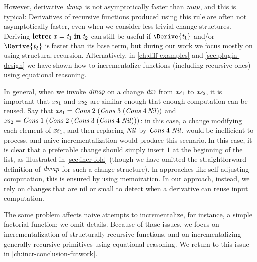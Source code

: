 However, derivative \ensuremath{\Varid{dmap}} is not asymptotically faster than \ensuremath{\Varid{map}}, and this is typical:
Derivatives of recursive functions
produced using this rule are often not asymptotically faster,
even when we consider less trivial change structures.
Deriving \ensuremath{\mathbf{letrec}\;\Varid{x}\mathrel{=}\Varid{t}_{1}\;\mathbf{in}\;\Varid{t}_{2}} can still be useful if \ensuremath{\Derive{\Varid{t}_{1}}}
and/or \ensuremath{\Derive{\Varid{t}_{2}}} is faster than its base term, but during our work we focus
mostly on using structural recursion. Alternatively, in \cref{ch:diff-examples}
and \cref{sec:plugin-design} we have shown how to incrementalize functions
(including recursive ones) using equational reasoning.

In general, when we invoke \ensuremath{\Varid{dmap}} on a change \ensuremath{\Varid{dxs}} from \ensuremath{\Varid{xs}_{1}} to \ensuremath{\Varid{xs}_{2}}, it is
important that \ensuremath{\Varid{xs}_{1}} and \ensuremath{\Varid{xs}_{2}} are similar enough that enough computation can be
reused. Say that \ensuremath{\Varid{xs}_{1}\mathrel{=}\Conid{Cons}\;\mathrm{2}\;(\Conid{Cons}\;\mathrm{3}\;(\Conid{Cons}\;\mathrm{4}}\linebreak\ensuremath{\Conid{Nil}))} and \ensuremath{\Varid{xs}_{2}\mathrel{=}\Conid{Cons}\;\mathrm{1}\;(\Conid{Cons}\;\mathrm{2}\;(\Conid{Cons}\;\mathrm{3}\;(\Conid{Cons}\;\mathrm{4}\;\Conid{Nil})))}: in this case, a change modifying each element of \ensuremath{\Varid{xs}_{1}},
and then replacing \ensuremath{\Conid{Nil}} by \ensuremath{\Conid{Cons}\;\mathrm{4}\;\Conid{Nil}}, would be inefficient to process, and
naive incrementalization would produce this scenario. In this case, it is clear
that a preferable change should simply insert \ensuremath{\mathrm{1}} at the beginning of the list,
as illustrated in \cref{sec:incr-fold} (though we have omitted the
straightforward definition of \ensuremath{\Varid{dmap}} for such a change structure).
In approaches like self-adjusting computation, this is ensured by using
memoization. In our approach, instead, we rely on changes that are nil or small
to detect when a derivative can reuse input computation.

The same problem affects naive attempts to incrementalize, for instance, a
simple factorial function; we omit details. Because of these issues, we focus on
incrementalization of structurally recursive functions, and on incrementalizing
generally recursive primitives using equational reasoning.
We return to this issue in \cref{ch:incr-conclusion-futwork}.

